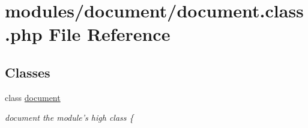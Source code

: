 \hypertarget{document_8class_8php}{\section{modules/document/document.class.\+php File Reference}
\label{document_8class_8php}
}
\subsection*{Classes}
\begin{DoxyCompactItemize}
\item 
class \hyperlink{classdocument}{document}
\begin{DoxyCompactList}\small\item\em document the module's high class \{ \end{DoxyCompactList}\end{DoxyCompactItemize}
